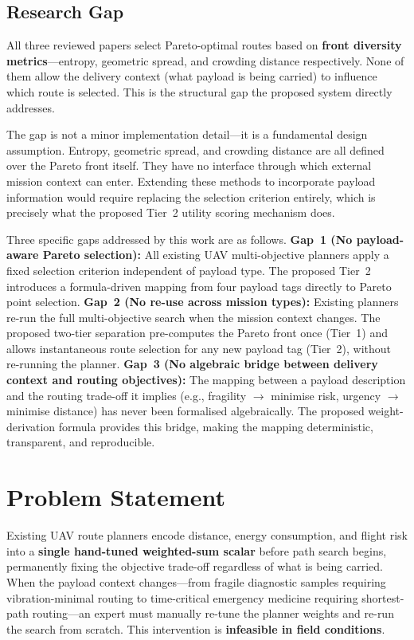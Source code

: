 \documentclass{ssnreview}
\begin{document}
\section{Research Gap}

All three reviewed papers select Pareto-optimal routes based on \textbf{front diversity
metrics}---entropy, geometric spread, and crowding distance respectively. None of them
allow the delivery context (what payload is being carried) to influence which route is
selected. This is the structural gap the proposed system directly addresses.

The gap is not a minor implementation detail---it is a fundamental design assumption.
Entropy, geometric spread, and crowding distance are all defined over the Pareto front
itself. They have no interface through which external mission context can enter.
Extending these methods to incorporate payload information would require replacing the
selection criterion entirely, which is precisely what the proposed Tier~2 utility
scoring mechanism does.

Three specific gaps addressed by this work are as follows. \textbf{Gap~1 (No
payload-aware Pareto selection):} All existing UAV multi-objective planners apply a
fixed selection criterion independent of payload type. The proposed Tier~2 introduces a
formula-driven mapping from four payload tags directly to Pareto point selection.
\textbf{Gap~2 (No re-use across mission types):} Existing planners re-run the full
multi-objective search when the mission context changes. The proposed two-tier separation
pre-computes the Pareto front once (Tier~1) and allows instantaneous route selection for
any new payload tag (Tier~2), without re-running the planner. \textbf{Gap~3 (No
algebraic bridge between delivery context and routing objectives):} The mapping between
a payload description and the routing trade-off it implies (e.g., fragility
$\rightarrow$ minimise risk, urgency $\rightarrow$ minimise distance) has never been
formalised algebraically. The proposed weight-derivation formula provides this bridge,
making the mapping deterministic, transparent, and reproducible.

\chapter{Problem Statement}

Existing UAV route planners encode distance, energy consumption, and flight risk into a
\textbf{single hand-tuned weighted-sum scalar} before path search begins, permanently
fixing the objective trade-off regardless of what is being carried. When the payload
context changes---from fragile diagnostic samples requiring vibration-minimal routing to
time-critical emergency medicine requiring shortest-path routing---an expert must
manually re-tune the planner weights and re-run the search from scratch. This
intervention is \textbf{infeasible in field conditions}.
\end{document}
